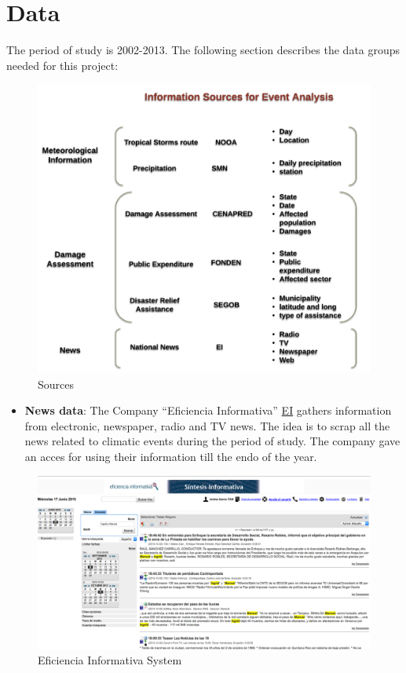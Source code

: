 \documentclass[]{article}
\begin{document}
\break 

\section{Data}\label{data}

The period of study is 2002-2013. The following section describes the
data groups needed for this project:

\begin{figure}[htbp]
\centering
\includegraphics{img/sources.png}
\caption{Sources}
\end{figure}

\break

\begin{itemize}
\itemsep1pt\parskip0pt
\item
  \textbf{News data}: The Company ``Eficiencia Informativa''
  \href{http://data4.efinf.com/reader/web/}{EI} gathers information from
  electronic, newspaper, radio and TV news. The idea is to scrap all the
  news related to climatic events during the period of study. The
  company gave an acces for using their information till the endo of the
  year.
\end{itemize}

\begin{figure}[htbp]
\centering
\includegraphics{img/EI.png}
\caption{Eficiencia Informativa System}
\end{figure}
\end{document}

